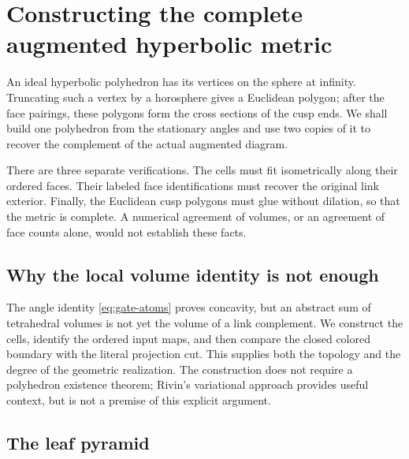 \chapter{Constructing the complete augmented hyperbolic metric}\label{ch:geometry}

An ideal hyperbolic polyhedron has its vertices on the sphere at infinity. Truncating such a vertex by a horosphere gives a Euclidean polygon; after the face pairings, these polygons form the cross sections of the cusp ends. We shall build one polyhedron from the stationary angles and use two copies of it to recover the complement of the actual augmented diagram.

There are three separate verifications. The cells must fit isometrically along their ordered faces. Their labeled face identifications must recover the original link exterior. Finally, the Euclidean cusp polygons must glue without dilation, so that the metric is complete. A numerical agreement of volumes, or an agreement of face counts alone, would not establish these facts.

\section{Why the local volume identity is not enough}
The angle identity \eqref{eq:gate-atoms} proves concavity, but an abstract sum of tetrahedral volumes is not yet the volume of a link complement. We construct the cells, identify the ordered input maps, and then compare the closed colored boundary with the literal projection cut. This supplies both the topology and the degree of the geometric realization. The construction does not require a polyhedron existence theorem; Rivin's variational approach \cite{Rivin1994} provides useful context, but is not a premise of this explicit argument.

\section{The leaf pyramid}

